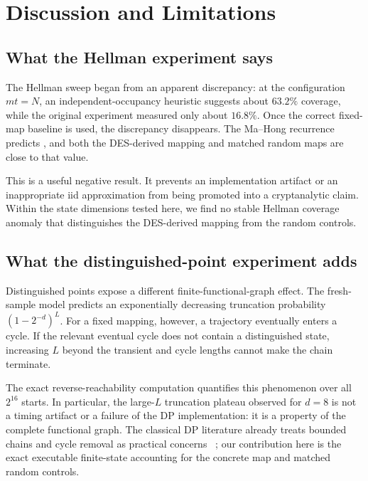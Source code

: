 \section{Discussion and Limitations}
\label{sec:discussion}

\subsection{What the Hellman experiment says}

The Hellman sweep began from an apparent discrepancy: at the configuration
$mt=N$, an independent-occupancy heuristic suggests about $63.2\%$ coverage,
while the original experiment measured only about $16.8\%$. Once the correct
fixed-map baseline is used, the discrepancy disappears. The Ma--Hong
recurrence predicts \StressMH{}, and both the DES-derived mapping and matched
random maps are close to that value.

This is a useful negative result. It prevents an implementation artifact or an
inappropriate iid approximation from being promoted into a cryptanalytic
claim. Within the state dimensions tested here, we find no stable Hellman
coverage anomaly that distinguishes the DES-derived mapping from the random
controls.

\subsection{What the distinguished-point experiment adds}

Distinguished points expose a different finite-functional-graph effect. The
fresh-sample model predicts an exponentially decreasing truncation probability
$(1-2^{-d})^L$. For a fixed mapping, however, a trajectory eventually enters a
cycle. If the relevant eventual cycle does not contain a distinguished state,
increasing $L$ beyond the transient and cycle lengths cannot make the chain
terminate.

The exact reverse-reachability computation quantifies this phenomenon over all
$2^{16}$ starts. In particular, the large-$L$ truncation plateau observed for
$d=8$ is not a timing artifact or a failure of the DP implementation: it is a
property of the complete functional graph. The classical DP literature already
treats bounded chains and cycle removal as practical concerns
~\cite{StandaertEtAl2002,AvoineJunodOechslin2008}; our contribution here is
the exact executable finite-state accounting for the concrete map and matched
random controls.

